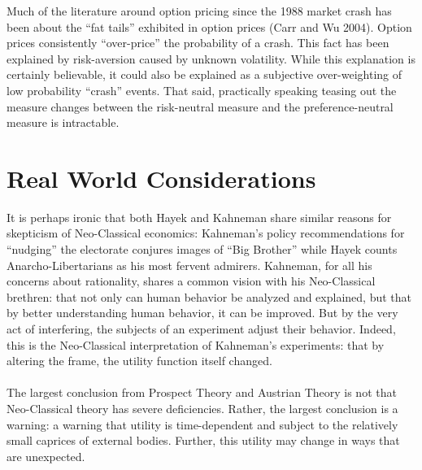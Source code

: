 \documentclass{article}
\begin{document}
Much of the literature around option pricing since the 1988 market crash has been about the ``fat tails'' exhibited in option prices (Carr and Wu 2004).  Option prices consistently ``over-price'' the probability of a crash.  This fact has been explained by risk-aversion caused by unknown volatility.  While this explanation is certainly believable, it could also be explained as a subjective over-weighting of low probability ``crash'' events.  That said, practically speaking teasing out the measure changes between the risk-neutral measure and the preference-neutral measure is intractable.  

\section{Real World Considerations}

It is perhaps ironic that both Hayek and Kahneman share similar reasons for skepticism of Neo-Classical economics: Kahneman's policy recommendations for ``nudging'' the electorate conjures images of ``Big Brother'' while Hayek counts Anarcho-Libertarians as his most fervent admirers.  Kahneman, for all his concerns about rationality, shares a common vision with his Neo-Classical brethren: that not only can human behavior be analyzed and explained, but that by better understanding human behavior, it can be improved. But by the very act of interfering, the subjects of an experiment adjust their behavior.  Indeed, this is the Neo-Classical interpretation of Kahneman's experiments: that by altering the frame, the utility function itself changed.  
\\
\\
The largest conclusion from Prospect Theory and Austrian Theory is not that Neo-Classical theory has severe deficiencies.  Rather, the largest conclusion is a warning: a warning that utility is time-dependent and subject to the relatively small caprices of external bodies.  Further, this utility may change in ways that are unexpected.  	
	
	
\end{document}
